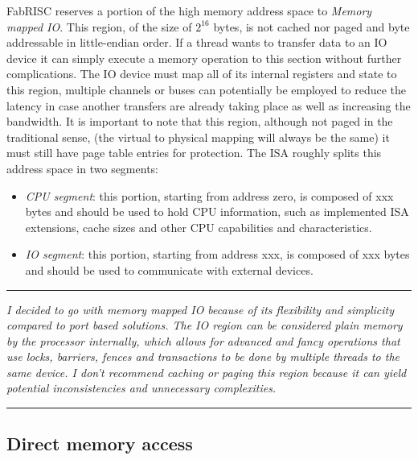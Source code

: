 \documentclass{article}
\begin{document}
            FabRISC reserves a portion of the high memory address space to \textit{Memory mapped IO}. This region, of the size of $2^{16}$ bytes, is not cached nor paged and byte addressable in little-endian order. If a thread wants to transfer data to an IO device it can simply execute a memory operation to this section without further complications. The IO device must map all of its internal registers and state to this region, multiple channels or buses can potentially be employed to reduce the latency in case another transfers are already taking place as well as increasing the bandwidth. It is important to note that this region, although not paged in the traditional sense, (the virtual to physical mapping will always be the same) it must still have page table entries for protection. The ISA roughly splits this address space in two segments:

            \begin{itemize}

                \item \textit{CPU segment}: this portion, starting from address zero, is composed of xxx bytes and should be used to hold CPU information, such as implemented ISA extensions, cache sizes and other CPU capabilities and characteristics.
                \item \textit{IO segment}: this portion, starting from address xxx, is composed of xxx bytes and should be used to communicate with external devices.

            \end{itemize}

        \par\noindent\rule{\textwidth}{0.4pt}
        \textit{I decided to go with memory mapped IO because of its flexibility and simplicity compared to port based solutions. The IO region can be considered plain memory by the processor internally, which allows for advanced and fancy operations that use locks, barriers, fences and transactions to be done by multiple threads to the same device. I don't recommend caching or paging this region because it can yield potential inconsistencies and unnecessary complexities.}
        \par\noindent\rule{\textwidth}{0.4pt}


        \subsection{Direct memory access}
\end{document}
